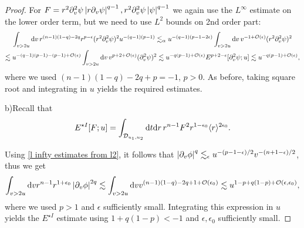 \documentclass[11pt, oneside]{amsart}
\begin{document}
\begin{proof}
		For $F=r^2\partial_v^2\psi \left\lvert r\partial_v\psi\right\rvert^{q-1},r^2\partial_v^2\psi \left\lvert \psi\right\rvert^{q-1}$ we again use the $L^\infty$ estimate on the lower order term, but we need to use $L^2$ bounds on 2nd order part:
		\begin{equation*}
			\begin{gathered}
				\int _{v>2u}\mathrm{d} v\,r^{(n-1)(1-q)-2q} r^{p-\epsilon}(r^2\partial_v^2\psi)^2u^{-(q-1)(p-1)}\lesssim_{\alpha}u^{-(q-1)(p-1-2\epsilon)}\int_{v>2u}\mathrm{d} v\, v^{-1+\mathcal{O}(\epsilon)}(r^2\partial_v^2\psi)^2\\
				\lesssim u^{-(q-1)(p-1)-(p-1)+\mathcal{O}(\epsilon)}\int_{v>2u}\mathrm{d} v\, v^{p+2+\mathcal{O}(\epsilon)}(\partial_v^2\psi)^2\lesssim u^{-q(p-1)+\mathcal{O}(\epsilon)}E^{p+2-\epsilon}[\partial_v^2\psi;u]\lesssim u^{-q(p-1)+\mathcal{O}(\epsilon)},
			\end{gathered}
		\end{equation*}
		where we used $(n-1)(1-q)-2q+p=-1$, $p>0$.
		As before, taking square root and integrating in $u$ yields the required estimates.
		
		b)Recall that
		\begin{equation*}
			\begin{gathered}
				E^{\star I}[F;u]=\int_{\mathcal{D}_{u_1,u_2}} \mathrm{d} t \mathrm{d} r\,r^{n-1}F^2r^{1-\epsilon_0}\langle r \rangle^{2\epsilon_0}.
			\end{gathered}
		\end{equation*}
		
		Using \cref{l infty estimates from l2}, it follows that $\left\lvert \partial_v\phi\right\rvert^q\lesssim_\epsilon u^{-(p-1-\epsilon)/2}v^{-(n+1-\epsilon)/2}$, thus we get
		\begin{equation*}
			\begin{gathered}				
				\int_{v>2u} \mathrm{d} v r^{n-1}r^{1+\epsilon_0}\left\lvert \partial_v\phi\right\rvert^{2q}\lesssim\int_{v>2u}\mathrm{d} v v^{(n-1)(1-q)-2q+1+\mathcal{O}(\epsilon_0)}\lesssim u^{1-p+q(1-p)+\mathcal{O}(\epsilon,\epsilon_0)},
			\end{gathered}
		\end{equation*}
		where we used $p>1$ and $\epsilon$ sufficiently small. Integrating this expression in $u$ yields the $E^{\star I}$ estimate using $1+q(1-p)<-1$ and $\epsilon,\epsilon_0$ sufficiently small.


\end{proof}
\end{document}
